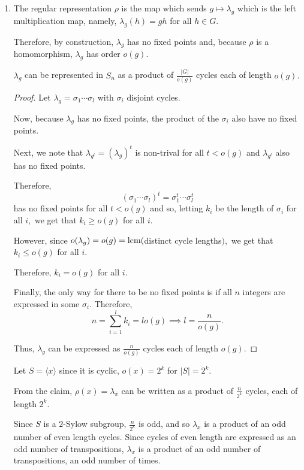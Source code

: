 \documentclass[12pt]{Qual}
\begin{document}
\begin{solution}$\,$
\begin{enumerate}[label=(\alph*)]
    \item The regular representation $\rho$ is the map which sends $g\mapsto\lambda_g$ which is the left multiplication map, namely, $\lambda_g(h)=gh$ for all $h\in G$.

    Therefore, by construction, $\lambda_g$ has no fixed points and, because $\rho$ is a homomorphism, $\lambda_g$ has order $o(g).$

    \begin{claim} $\lambda_g$ can be represented in $S_n$ as a product of $\frac{|G|}{o(g)}$ cycles each of length $o(g).$
    \begin{proof} Let $\lambda_g=\sigma_1\cdots\sigma_l$ with $\sigma_i$ disjoint cycles.

    Now, because $\lambda_g$ has no fixed points, the product of the $\sigma_i$ also have no fixed points.

    Next, we note that $\lambda_{g^t}=(\lambda_g)^t$ is non-trival for all $t<o(g)$ and $\lambda_{g^t}$ also has no fixed points.

    Therefore, $$(\sigma_1\cdots\sigma_l)^t=\sigma_1^t\cdots\sigma_l^t$$ has no fixed points for all $t<o(g)$ and so, letting $k_i$ be the length of $\sigma_i$ for all $i,$ we get that $k_i\ge o(g)$ for all $i$.

    However, since $o(\lambda_g)=o(g)=\text{lcm}($distinct cycle lengths$),$ we get that $k_i\le o(g)$ for all $i.$

    Therefore, $k_i=o(g)$ for all $i.$

    Finally, the only way for there to be no fixed points is if all $n$ integers are expressed in some $\sigma_i.$ Therefore, $$n=\sum_{i=1}^lk_i=lo(g)\implies l=\frac{n}{o(g)}.$$

    Thus, $\lambda_g$ can be expressed as $\frac{n}{o(g)}$ cycles each of length $o(g).$
    \end{proof}
    \end{claim}

    Let $S=\langle x\rangle$ since it is cyclic, $o(x)=2^k$ for $|S|=2^k.$

    From the claim, $\rho(x)=\lambda_x$ can be written as a product of $\frac{n}{2^k}$ cycles, each of length $2^k.$

    Since $S$ is a $2$-Sylow subgroup, $\frac{n}{2^k}$ is odd, and so $\lambda_x$ is a product of an odd number of even length cycles. Since cycles of even length are expressed as an odd number of transpositions, $\lambda_x$ is a product of an odd number of transpositions, an odd number of times.


\end{enumerate}
\end{solution}
\end{document}

